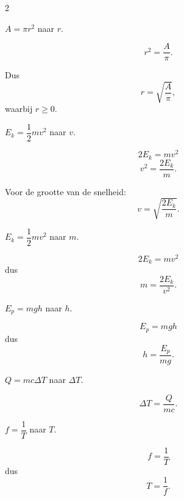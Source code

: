 \documentclass{ximera}
\begin{document}
\begin{oefening}{\oefB\ESS}
\begin{multicols}{2}
\begin{question}
$A=\pi r^2$ naar $r$.

\begin{oplossing}
\[
r^2=\dfrac{A}{\pi}.
\]

Dus
\[
r=\sqrt{\dfrac{A}{\pi}},
\]
waarbij $r\geq0$.
\end{oplossing}
\end{question}


\begin{question}
$E_k=\dfrac12mv^2$ naar $v$.

\begin{oplossing}
\[
2E_k=mv^2
\]
\[
v^2=\dfrac{2E_k}{m}.
\]

Voor de grootte van de snelheid:
\[
v=\sqrt{\dfrac{2E_k}{m}}.
\]
\end{oplossing}
\end{question}


\begin{question}
$E_k=\dfrac12mv^2$ naar $m$.

\begin{oplossing}
\[
2E_k=mv^2
\]
dus
\[
m=\dfrac{2E_k}{v^2}.
\]
\end{oplossing}
\end{question}


\begin{question}
$E_p=mgh$ naar $h$.

\begin{oplossing}
\[
E_p=mgh
\]
dus
\[
h=\dfrac{E_p}{mg}.
\]
\end{oplossing}
\end{question}


\begin{question}
$Q=mc\Delta T$ naar $\Delta T$.

\begin{oplossing}
\[
\Delta T
=\dfrac{Q}{mc}.
\]
\end{oplossing}
\end{question}


\begin{question}
$f=\dfrac1T$ naar $T$.

\begin{oplossing}
\[
f=\dfrac1T
\]
dus
\[
T=\dfrac1f.
\]
\end{oplossing}
\end{question}

\end{multicols}

\end{oefening}
\end{document}
